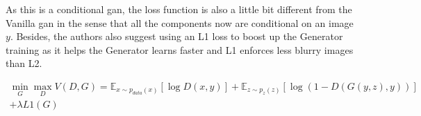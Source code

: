 As this is a conditional \acrshort{gan}, the loss function is also a little bit different
from the Vanilla \acrshort{gan} in the sense that all the components now are conditional
on an image $y$.  Besides, the authors also suggest using an L1 loss to boost up the
Generator training as it helps the Generator learns faster and L1 enforces less blurry
images than L2.

\begin{align*}
	\min_{G} \max_{D} V(D, G) = \mathbb{E}_{x \sim p_{data}(x)} [\log D(x, y)] +
	\mathbb{E}_{z \sim p_z(z)}[\log(1 - D(G(y, z), y))] \\ 
	+ \lambda L1(G)
\end{align*}


